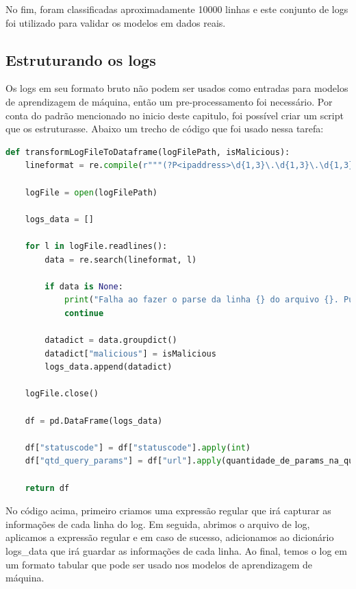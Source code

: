 No fim, foram classificadas aproximadamente 10000 linhas e este conjunto de logs foi utilizado para validar os modelos em dados
reais.

\subsection{Estruturando os logs}

Os logs em seu formato bruto não podem ser usados como entradas para modelos de aprendizagem
de máquina, então um pre-processamento foi necessário. Por conta do padrão mencionado no inicio 
deste capitulo, foi possível criar um script que os estruturasse. Abaixo um trecho de código
que foi usado nessa tarefa:

\begin{lstlisting}[language=Python]
def transformLogFileToDataframe(logFilePath, isMalicious):
    lineformat = re.compile(r"""(?P<ipaddress>\d{1,3}\.\d{1,3}\.\d{1,3}\.\d{1,3}) - - \[(?P<dateandtime>\d{2}\/[a-z]{3}\/\d{4}:\d{2}:\d{2}:\d{2} (\+|\-)\d{4})\] ((\"(GET|POST) )(?P<url>.+)(http\/[1-2]\.[0-9]")) (?P<statuscode>\d{3}) (?P<bytessent>\d+) (?P<refferer>-|"([^"]+)") (["](?P<useragent>[^"]+)["])""", re.IGNORECASE)

    logFile = open(logFilePath)

    logs_data = []

    for l in logFile.readlines():
        data = re.search(lineformat, l)

        if data is None:
            print("Falha ao fazer o parse da linha {} do arquivo {}. Pulando..".format(l, logFile))
            continue

        datadict = data.groupdict()
        datadict["malicious"] = isMalicious
        logs_data.append(datadict)

    logFile.close()

    df = pd.DataFrame(logs_data)

    df["statuscode"] = df["statuscode"].apply(int)
    df["qtd_query_params"] = df["url"].apply(quantidade_de_params_na_query)

    return df
\end{lstlisting}

No código acima, primeiro criamos uma expressão regular que irá capturar as informações de cada linha do log. 
Em seguida, abrimos o arquivo de log, aplicamos a expressão regular e em caso de sucesso, adicionamos ao 
dicionário logs\_data que irá guardar as informações de cada linha. Ao final, temos o log em um formato tabular
que pode ser usado nos modelos de aprendizagem de máquina.